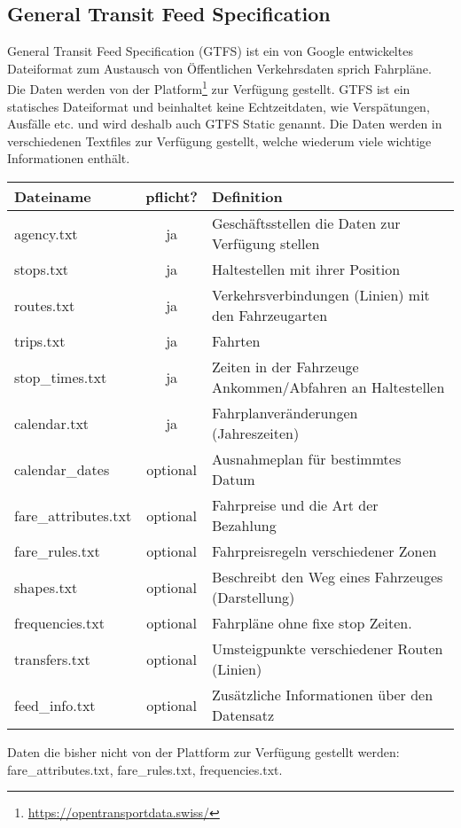 \subsection{General Transit Feed Specification}
General Transit Feed Specification (GTFS) ist ein von Google entwickeltes Dateiformat zum Austausch von Öffentlichen Verkehrsdaten sprich Fahrpläne. Die Daten werden von der Platform\footnote{\url{https://opentransportdata.swiss/}} zur Verfügung gestellt. GTFS ist ein statisches Dateiformat und beinhaltet keine Echtzeitdaten, wie Verspätungen, Ausfälle etc. und wird deshalb auch GTFS Static genannt. Die Daten werden in verschiedenen Textfiles zur Verfügung gestellt, welche wiederum viele wichtige Informationen enthält.\newline

\begin{tabular}{|l|c|l|}  \hline
	Dateiname & pflicht? & Definition \\ \hline
	agency.txt & ja & Geschäftsstellen die Daten zur Verfügung stellen \\ \hline
	stops.txt & ja & Haltestellen mit ihrer Position \\ \hline
	routes.txt & ja & Verkehrsverbindungen (Linien) mit den Fahrzeugarten \\ \hline %
	trips.txt & ja & Fahrten  \\ \hline												%
	stop\_times.txt & ja & Zeiten in der Fahrzeuge Ankommen/Abfahren an Haltestellen \\ \hline
	calendar.txt & ja & Fahrplanveränderungen (Jahreszeiten) \\ \hline
	calendar\_dates & optional & Ausnahmeplan für bestimmtes Datum \\ \hline
	fare\_attributes.txt & optional & Fahrpreise und die Art der Bezahlung \\ \hline
	fare\_rules.txt & optional & Fahrpreisregeln verschiedener Zonen  \\ \hline
	shapes.txt & optional & Beschreibt den Weg eines Fahrzeuges (Darstellung) \\ \hline
	frequencies.txt & optional & Fahrpläne ohne fixe stop Zeiten. \\ \hline
	transfers.txt & optional & Umsteigpunkte verschiedener Routen (Linien) \\ \hline
	feed\_info.txt & optional & Zusätzliche Informationen über den Datensatz \\ \hline	
\end{tabular}

Daten die bisher nicht von der Plattform zur Verfügung gestellt werden: fare\_attributes.txt, fare\_rules.txt, frequencies.txt.


